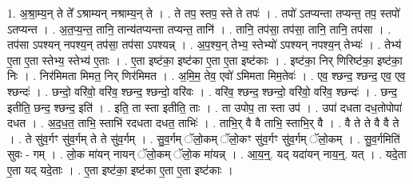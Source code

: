 \documentclass[17pt]{extarticle}
\begin{document}
1. अ॒श्रा॒म्य॒न् ते ते᳚ ऽश्राम्यन् नश्राम्य॒न् ते । . ते तप॒ स्तप॒ स्ते ते तपः॑ । . तपो॑ ऽतप्यन्ता तप्यन्त॒ तप॒ स्तपो॑ ऽतप्यन्त । . अ॒त॒प्य॒न्त॒ तानि॒ तान्य॑तप्यन्ता तप्यन्त॒ तानि॑ । . तानि॒ तप॑सा॒ तप॑सा॒ तानि॒ तानि॒ तप॑सा । . तप॑सा ऽपश्यन् नपश्य॒न् तप॑सा॒ तप॑सा ऽपश्यन्न् । . अ॒प॒श्य॒न् तेभ्य॒ स्तेभ्यो॑ ऽपश्यन् नपश्य॒न् तेभ्यः॑ । . तेभ्य॑ ए॒ता ए॒ता स्तेभ्य॒ स्तेभ्य॑ ए॒ताः । . ए॒ता इष्ट॑का॒ इष्ट॑का ए॒ता ए॒ता इष्ट॑काः । . इष्ट॑का॒ निर् णिरिष्ट॑का॒ इष्ट॑का॒ निः । . निर॑मिमता मिमत॒ निर् णिर॑मिमत । . अ॒मि॒म॒ तेव॒ एवो॑ ऽमिमता मिम॒तेवः॑ । . एव॒ श्छन्द॒ श्छन्द॒ एव॒ एव॒ श्छन्दः॑ । . छन्दो॒ वरि॑वो॒ वरि॑व॒ श्छन्द॒ श्छन्दो॒ वरि॑वः । . वरि॑व॒ श्छन्द॒ श्छन्दो॒ वरि॑वो॒ वरि॑व॒ श्छन्दः॑ । . छन्द॒ इतीति॒ छन्द॒ श्छन्द॒ इति॑ । . इति॒ ता स्ता इतीति॒ ताः । . ता उपोप॒ ता स्ता उप॑ । . उपा॑ दधता दध॒तोपोपा॑ दधत । . अ॒द॒ध॒त॒ ताभि॒ स्ताभि॑ रदधता दधत॒ ताभिः॑ । . ताभि॒र् वै वै ताभि॒ स्ताभि॒र् वै । . वै ते ते वै वै ते । . ते सु॑व॒र्गꣳ सु॑व॒र्गम् ते ते सु॑व॒र्गम् । . सु॒व॒र्गम् ॅलो॒कम् ॅलो॒कꣳ सु॑व॒र्गꣳ सु॑व॒र्गम् ॅलो॒कम् । . सु॒व॒र्गमिति॑ सुवः - गम् । . लो॒क मा॑यन् नायन् ॅलो॒कम् ॅलो॒क मा॑यन्न् । . आ॒य॒न्॒. यद् यदा॑यन् नाय॒न्॒. यत् । . यदे॒ता ए॒ता यद् यदे॒ताः । . ए॒ता इष्ट॑का॒ इष्ट॑का ए॒ता ए॒ता इष्ट॑काः । \newline
\end{document}
